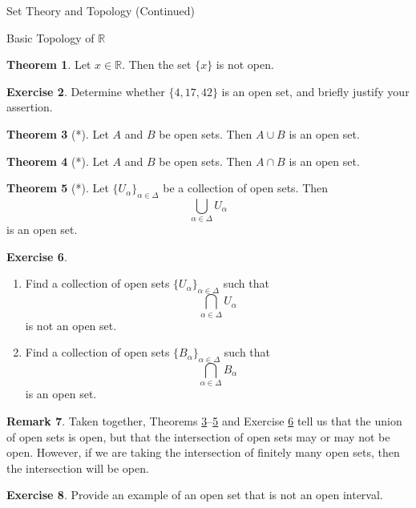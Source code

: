 \documentclass[11pt]{article}
\theoremstyle{definition}
\newtheorem{theorem}{Theorem}[section]
\newtheorem{exercise}[theorem]{Exercise}
\newtheorem{remark}[theorem]{Remark}
\begin{document}
\begin{section}{Set Theory and Topology (Continued)}
\begin{subsection}{Basic Topology of $\mathbb{R}$}
\begin{theorem}
Let $x\in\mathbb{R}$.  Then the set $\{x\}$ is not open.
\end{theorem}

\begin{exercise} 
Determine whether $\{4,17,42\}$ is an open set, and briefly justify your assertion. 
\end{exercise}

\begin{theorem}[*]\label{finite union of open sets}
Let $A$ and $B$ be open sets.  Then $A\cup B$ is an open set. 
\end{theorem}

\begin{theorem}[*]\label{finite intersection of open sets}
Let $A$ and $B$ be open sets.  Then $A\cap B$ is an open set.
\end{theorem}

\begin{theorem}[*]\label{union of open sets}
Let $\{U_{\alpha}\}_{\alpha\in\Delta}$ be a collection of open sets.  Then
\[
\bigcup_{\alpha\in\Delta} U_{\alpha}
\]
is an open set.
\end{theorem}

\begin{exercise}\label{intersection of open sets}\
\begin{enumerate}
\item Find a collection of open sets $\{U_{\alpha}\}_{\alpha\in\Delta}$ such that
\[
\bigcap_{\alpha\in\Delta} U_{\alpha}
\]
is not an open set.
\item Find a collection of open sets $\{B_{\alpha}\}_{\alpha\in\Delta}$ such that
\[
\bigcap_{\alpha\in\Delta} B_{\alpha}
\]
is an open set.
\end{enumerate}
\end{exercise}

\begin{remark}\label{union vs intersection of open sets}
Taken together, Theorems \ref{finite union of open sets}--\ref{union of open sets} and Exercise \ref{intersection of open sets} tell us that the union of open sets is open, but that the intersection of open sets may or may not be open.  However, if we are taking the intersection of finitely many open sets, then the intersection will be open.
\end{remark}

\begin{exercise}
Provide an example of an open set that is not an open interval.
\end{exercise}


\end{subsection}
\end{section}
\end{document}
